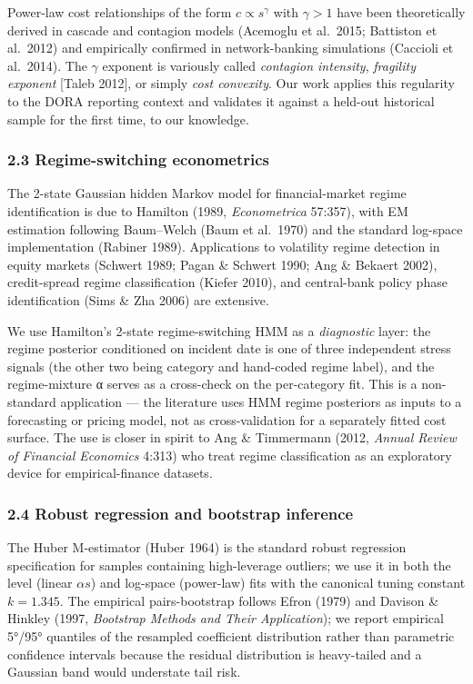 \documentclass[
]{article}
\begin{document}
Power-law cost relationships of the form \(c \propto s^\gamma\) with
\(\gamma > 1\) have been theoretically derived in cascade and contagion
models (Acemoglu et al.~2015; Battiston et al.~2012) and empirically
confirmed in network-banking simulations (Caccioli et al.~2014). The
\(\gamma\) exponent is variously called \emph{contagion intensity},
\emph{fragility exponent} {[}Taleb 2012{]}, or simply \emph{cost
convexity}. Our work applies this regularity to the DORA reporting
context and validates it against a held-out historical sample for the
first time, to our knowledge.

\subsubsection{2.3 Regime-switching
econometrics}\label{regime-switching-econometrics}

The 2-state Gaussian hidden Markov model for financial-market regime
identification is due to Hamilton (1989, \emph{Econometrica} 57:357),
with EM estimation following Baum--Welch (Baum et al.~1970) and the
standard log-space implementation (Rabiner 1989). Applications to
volatility regime detection in equity markets (Schwert 1989; Pagan \&
Schwert 1990; Ang \& Bekaert 2002), credit-spread regime classification
(Kiefer 2010), and central-bank policy phase identification (Sims \& Zha
2006) are extensive.

We use Hamilton's 2-state regime-switching HMM as a \emph{diagnostic}
layer: the regime posterior conditioned on incident date is one of three
independent stress signals (the other two being category and hand-coded
regime label), and the regime-mixture α serves as a cross-check on the
per-category fit. This is a non-standard application --- the literature
uses HMM regime posteriors as inputs to a forecasting or pricing model,
not as cross-validation for a separately fitted cost surface. The use is
closer in spirit to Ang \& Timmermann (2012, \emph{Annual Review of
Financial Economics} 4:313) who treat regime classification as an
exploratory device for empirical-finance datasets.

\subsubsection{2.4 Robust regression and bootstrap
inference}\label{robust-regression-and-bootstrap-inference}

The Huber M-estimator (Huber 1964) is the standard robust regression
specification for samples containing high-leverage outliers; we use it
in both the level (linear \(\alpha s\)) and log-space (power-law) fits
with the canonical tuning constant \(k = 1.345\). The empirical
pairs-bootstrap follows Efron (1979) and Davison \& Hinkley (1997,
\emph{Bootstrap Methods and Their Application}); we report empirical
5°/95° quantiles of the resampled coefficient distribution rather than
parametric confidence intervals because the residual distribution is
heavy-tailed and a Gaussian band would understate tail risk.
\end{document}
